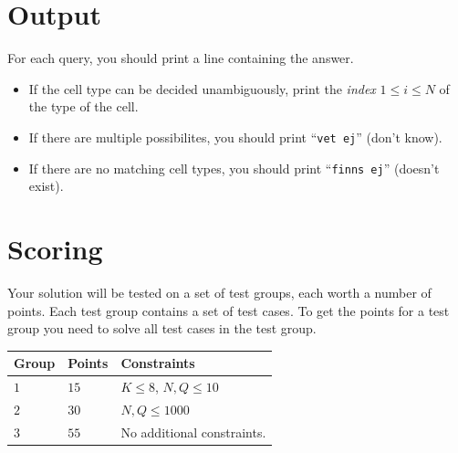 \section*{Output}
For each query, you should print a line containing the answer.

\begin{itemize}
  \item If the cell type can be decided unambiguously, print the \textit{index} $1 \leq i \leq N$ of the type of the cell.
  \item If there are multiple possibilites, you should print ``\texttt{vet ej}'' (don't know).
  \item If there are no matching cell types, you should print ``\texttt{finns ej}'' (doesn't exist).
\end{itemize}

\section*{Scoring}
Your solution will be tested on a set of test groups, each worth a number of points. Each test group contains
a set of test cases. To get the points for a test group you need to solve all test cases in the test group.

\noindent
\begin{tabular}{| l | l | p{12cm} |}
  \hline
  \textbf{Group} & \textbf{Points} & \textbf{Constraints} \\ \hline
  $1$     & $15$         & $ K \le 8$, $N, Q \leq 10$\\ \hline
  $2$     & $30$         & $ N, Q \leq 1000$\\ \hline
  $3$     & $55$         & No additional constraints. \\ \hline
\end{tabular}
